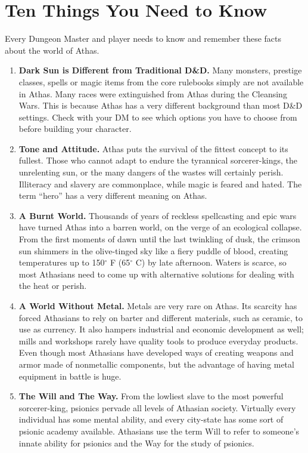 \section{Ten Things You Need to Know}

Every Dungeon Master and player needs to know and remember these facts about the world of Athas.

\begin{enumerate}
\item \textbf{{\tableheader Dark Sun} is Different from Traditional D\&D.} Many monsters, prestige classes, spells or magic items from the core rulebooks simply are not available in Athas. Many races were extinguished from Athas during the Cleansing Wars. This is because Athas has a very different background than most D\&D settings. Check with your DM to see which options you have to choose from before building your character.
\item \textbf{Tone and Attitude.} Athas puts the survival of the fittest concept to its fullest. Those who cannot adapt to endure the tyrannical sorcerer-kings, the unrelenting sun, or the many dangers of the wastes will certainly perish. Illiteracy and slavery are commonplace, while magic is feared and hated. The term ``hero'' has a very different meaning on Athas.
\item \textbf{A Burnt World.} Thousands of years of reckless spellcasting and epic wars have turned Athas into a barren world, on the verge of an ecological collapse. From the first moments of dawn until the last twinkling of dusk, the crimson sun shimmers in the olive-tinged sky like a fiery puddle of blood, creating temperatures up to 150$^\circ$ F (65$^\circ$ C) by late afternoon. Waters is scarce, so most Athasians need to come up with alternative solutions for dealing with the heat or perish.
\item \textbf{A World Without Metal.} Metals are very rare on Athas. Its scarcity has forced Athasians to rely on barter and different materials, such as ceramic, to use as currency. It also hampers industrial and economic development as well; mills and workshops rarely have quality tools to produce everyday products. Even though most Athasians have developed ways of creating weapons and armor made of nonmetallic components, but the advantage of having metal equipment in battle is huge.
\item \textbf{The Will and The Way.} From the lowliest slave to the most powerful sorcerer-king, psionics pervade all levels of Athasian society. Virtually every individual has some mental ability, and every city-state has some sort of psionic academy available. Athasians use the term Will to refer to someone's innate ability for psionics and the Way for the study of psionics.

\end{enumerate}
